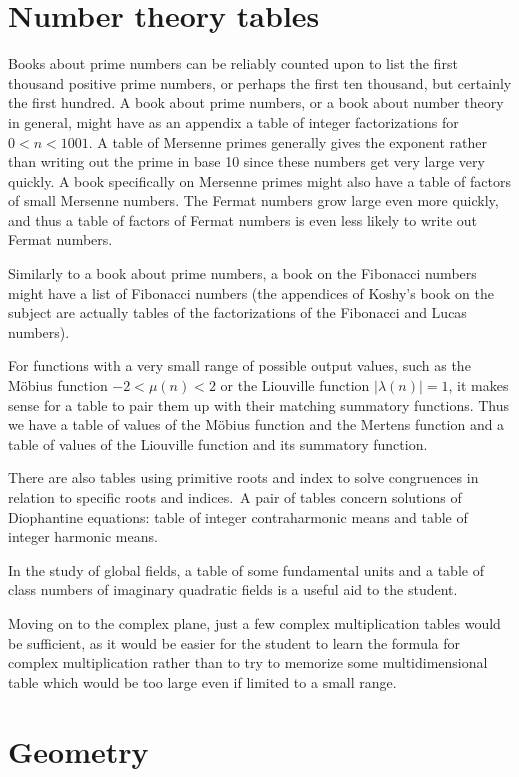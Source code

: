 \documentclass[12pt]{article}
\begin{document}
\section{Number theory tables}

Books about prime numbers can be reliably counted upon to list the first thousand positive prime numbers, or perhaps the first ten thousand, but certainly the first hundred. A book about prime numbers, or a book about number theory in general, might have as an appendix a table of integer factorizations for $0 < n < 1001$. A table of Mersenne primes generally gives the exponent rather than writing out the prime in base 10 since these numbers get very large very quickly. A book specifically on Mersenne primes might also have a table of factors of small Mersenne numbers. The Fermat numbers grow large even more quickly, and thus a table of factors of Fermat numbers is even less likely to write out Fermat numbers.

Similarly to a book about prime numbers, a book on the Fibonacci numbers might have a list of Fibonacci numbers (the appendices of Koshy's book on the subject are actually tables of the factorizations of the Fibonacci and Lucas numbers).

For functions with a very small range of possible output values, such as the M\"obius function $-2 < \mu(n) < 2$ or the Liouville function $| \lambda(n) | = 1$, it makes sense for a table to pair them up with their matching summatory functions. Thus we have a table of values of the M\"obius function and the Mertens function and a table of values of the Liouville function and its summatory function.

There are also tables using primitive roots and index to solve congruences in relation to specific roots and indices.\, A pair of tables concern solutions of Diophantine equations: table of integer contraharmonic means and table of integer harmonic means.

In the study of global fields, a table of some fundamental units and a table of class numbers of imaginary quadratic fields is a useful aid to the student.

Moving on to the complex plane, just a few complex multiplication tables would be sufficient, as it would be easier for the student to learn the formula for complex multiplication rather than to try to memorize some multidimensional table which would be too large even if limited to a small range.

\section{Geometry}
\end{document}
